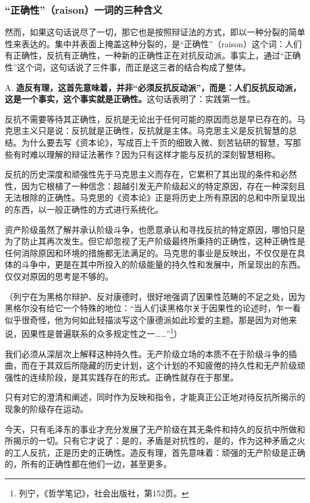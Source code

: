 \documentclass[fontset=fandol, a4paper, 12pt, twoside]{ctexart}
\begin{document}
\subsubsection*{“正确性”（raison）一词的三种含义}

然而，如果这句话说尽了一切，那它也是按照辩证法的方式，即以一种分裂的简单性来表达的。集中并表面上掩盖这种分裂的，是“正确性”（raison）这个词：人们有正确性，反抗有正确性，一种新的正确性正在对抗反动派。事实上，通过“正确性”这个词，这句话说了三件事，而正是这三者的结合构成了整体。

A. \textbf{造反有理，这首先意味着，并非“必须反抗反动派”，而是：人们反抗反动派，这是一个事实，这个事实就是正确性。}这句话表明了：实践第一性。

反抗不需要等待其正确性，反抗是无论出于任何可能的原因而总是早已存在的。马克思主义只是说：反抗就是正确性，反抗就是主体。马克思主义是反抗智慧的总结。为什么要去写《资本论》，写成百上千页的细致入微、刻苦钻研的智慧，写那些有时难以理解的辩证法著作？因为只有这样才能与反抗的深刻智慧相称。

反抗的历史深度和顽强性先于马克思主义而存在，它累积了其出现的条件和必然性，因为它根植了一种信念：超越引发无产阶级起义的特定原因，存在一种深刻且无法根除的正确性。马克思的《资本论》正是将历史上所有原因的总和中所呈现出的东西，以一般正确性的方式进行系统化。

资产阶级虽然了解并承认阶级斗争，也愿意承认和寻找反抗的特定原因，哪怕只是为了防止其再次发生。但它却忽视了无产阶级最终所秉持的正确性，这种正确性是任何消除原因和环境的措施都无法满足的。马克思的事业是反映出，不仅仅是在具体的斗争中，更是在其中所投入的阶级能量的持久性和发展中，所呈现出的东西。仅仅对原因的思考是不够的。

（列宁在为黑格尔辩护、反对康德时，很好地强调了因果性范畴的不足之处，因为黑格尔没有给它一个特殊的地位：“当人们读黑格尔关于因果性的论述时，乍一看似乎很奇怪，他为何如此轻描淡写这个康德派如此珍爱的主题。那是因为对他来说，因果性是普遍联系的众多规定性之一……”\footnote{列宁，《哲学笔记》，社会出版社，第152页。}）

我们必须从深层次上解释这种持久性。无产阶级立场的本质不在于阶级斗争的插曲，而在于其双后所隐藏的历史计划，这个计划的不知疲倦的持久性和无产阶级顽强性的连续阶段，是其实践存在的形式。正确性就存在于那里。

只有对它的澄清和阐述，同时作为反映和指令，才能真正公正地对待反抗所揭示的现象的阶级存在运动。

今天，只有毛泽东的事业才充分发展了无产阶级在其无条件和持久的反抗中所做和所揭示的一切。只有它才说了：是的，矛盾是对抗性的，是的，作为这种矛盾之火的工人反抗，正是历史的正确性。造反有理，首先意味着：顽强的无产阶级是正确的，所有的正确性都在他们一边，甚至更多。
\end{document}
